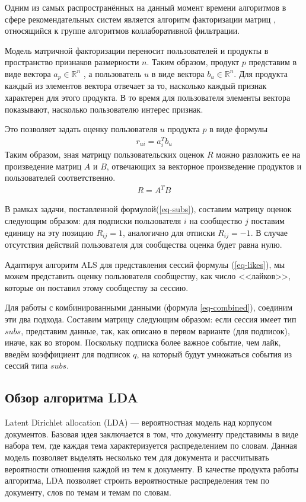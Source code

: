 \documentclass[times,specification,annotation]{itmo-student-thesis}
\begin{document}
Одним из самых распространённых на данный момент времени алгоритмов в сфере рекомендательных систем является алгоритм факторизации матриц \cite{koren2009}, относящийся к группе алгоритмов коллаборативной фильтрации.

Модель матричной факторизации переносит пользователей и продукты в пространство признаков размерности $n$. Таким образом, продукт $p$ представим в виде вектора $a_{p} \in \mathbb{R}^n$ , а пользователь $u$ в виде вектора $b_{u} \in \mathbb{R}^n$. Для продукта каждый из элементов вектора отвечает за то, насколько каждый признак характерен для  этого продукта. В то время для пользователя элементы вектора показывают, насколько пользователю интерес признак.

Это позволяет задать оценку пользователя $u$ продукта $p$ в виде формулы
 \begin{align*}
r_{ui} = a_{i}^{T}b_{u}
\end{align*}
Таким образом, зная матрицу пользовательских оценок $R$ можно разложить ее на произведение матриц $A$ и $B$, отвечающих за векторное произведение продуктов и пользователей соответственно.
 \begin{align*}
R = A^TB
\end{align*}

В рамках задачи, поставленной формулой(\ref{eq-subs}), составим матрицу оценок следующим образом: для подписки пользователя $i$ на сообщество $j$ поставим единицу на эту позицию $R_{ij} = 1$, аналогично для отписки $R_{ij} = - 1$. В случае отсутствия действий пользователя для сообщества оценка будет равна нулю.

Адаптируя алгоритм ALS для представления сессий формулы (\ref{eq-likes}), мы можем представить оценку пользователя сообществу, как число <<лайков>>, которые он поставил этому сообществу за сессию.

Для работы с комбинированными данными (формула \ref{eq-combined}), соединим эти два подхода. Составим матрицу следующим образом: если сессия имеет тип $subs$, представим данные, так, как описано в первом варианте (для подписок), иначе, как во втором. Поскольку подписка более важное событие, чем лайк, введём коэффициент для подписок $q$, на который будут умножаться события из сессий типа $subs$.   


\subsection{Обзор алгоритма LDA}\label{sec:lda}

Latent Dirichlet allocation (LDA) \cite{lda2003} --- вероятностная модель над корпусом документов. Базовая идея заключается в том, что документу представимы в виде набора тем, где каждая тема характеризуется распределением по словам. Данная модель позволяет выделять несколько тем для документа и рассчитывать вероятности отношения каждой из тем к документу.
В качестве продукта работы алгоритма, LDA позволяет строить вероятностные распределения тем по документу, слов по темам и темам по словам.
\end{document}
